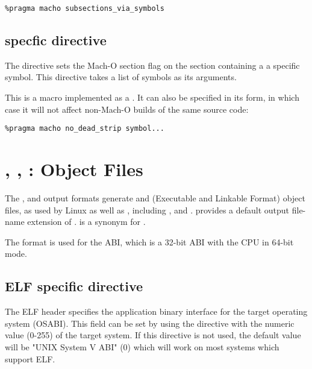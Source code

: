 \begin{lstlisting}
%pragma macho subsections_via_symbols
\end{lstlisting}

\subsection{ specfic directive }
\label{subsec:macho-ssvs}

The directive  sets the Mach-O 
section flag on the section containing a a specific symbol. This directive takes
a list of symbols as its arguments.

This is a macro implemented as a .  It can also be
specified in its  form, in which case it will not affect
non-Mach-O builds of the same source code:

\begin{lstlisting}
%pragma macho no_dead_strip symbol...
\end{lstlisting}

\section{, , :
 Object Files}
\label{sec:elffmt}

The ,  and  output formats generate
 and  (Executable and Linkable Format) object files,
as used by Linux as well as , including
,  and .
 provides a default output file-name extension of .
 is a synonym for .

The  format is used for the  ABI, which is
a 32-bit ABI with the CPU in 64-bit mode.

\subsection{ELF specific directive }
\label{subsec:abisect}

The ELF header specifies the application binary interface for the
target operating system (OSABI). This field can be set by using the
 directive with the numeric value (0-255) of the target
system. If this directive is not used, the default value will be "UNIX
System V ABI" (0) which will work on most systems which support ELF.


